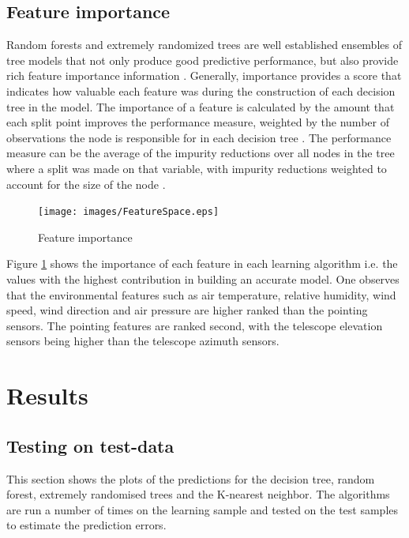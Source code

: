 \subsection{Feature importance}
Random forests and extremely randomized trees are well established ensembles of tree models that not only produce good predictive performance, but also provide rich feature importance information \citep{kazemitabar2017variable}. Generally, importance provides a score that indicates how  valuable each feature was during the construction of each decision tree in the model. The importance of a feature is calculated by the amount that each split point improves the performance measure, weighted by the number of observations the node is responsible for in each decision tree \citep{kazemitabar2017variable}. The performance measure can be the average of the impurity reductions over all nodes in the tree where a split was made on that variable, with impurity reductions weighted to account for the size of the node \citep{kazemitabar2017variable}.

\begin{figure}[H]
  \centering
    \texttt{[image: images/FeatureSpace.eps]}
    \caption{Feature importance}
    \label{FI}
\end{figure}
Figure \ref{FI} shows the importance of each feature in each learning algorithm i.e. the values with the highest contribution in building an accurate model. One observes that the environmental features such as air temperature, relative humidity, wind speed, wind direction and air pressure are higher ranked than the pointing sensors. The pointing features are ranked second, with the telescope elevation sensors being higher than the telescope azimuth sensors. 

\section{Results}

\subsection{Testing on test-data}
\label{sec3}
This section shows the plots of the predictions for the decision tree, random forest, extremely randomised trees and the K-nearest neighbor. The algorithms are run a number of times on the learning sample and tested on the test samples to estimate the prediction errors. 
